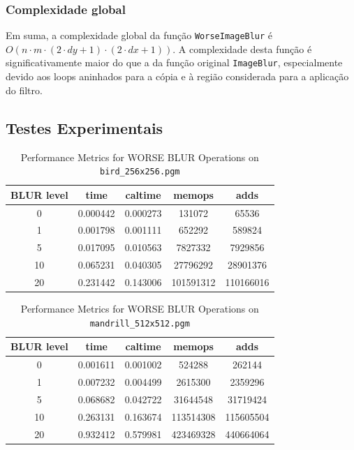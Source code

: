 \documentclass{report}
\begin{document}
\subsubsection{Complexidade global}
Em suma, a complexidade global da função \texttt{WorseImageBlur} é \(O(n \cdot m \cdot (2 \cdot dy + 1) \cdot (2 \cdot dx + 1))\). 
A complexidade desta função é significativamente maior do que a da função original \texttt{ImageBlur},
especialmente devido aos loops aninhados para a cópia e à região considerada para a aplicação do filtro.


\subsection{Testes Experimentais}

\begin{table}[h]
    \centering
    \begin{tabular}{ccccc}
        \toprule
        \textbf{BLUR level} & \textbf{time} & \textbf{caltime} & \textbf{memops} & \textbf{adds} \\
        \midrule
        0 & 0.000442 & 0.000273 & 131072 & 65536 \\
        1 & 0.001798 & 0.001111 & 652292 & 589824 \\
        5 & 0.017095 & 0.010563 & 7827332 & 7929856 \\
        10 & 0.065231 & 0.040305 & 27796292 & 28901376 \\
        20 & 0.231442 & 0.143006 & 101591312 & 110166016 \\
        \bottomrule
    \end{tabular}
    \caption*{Performance Metrics for WORSE BLUR Operations on \texttt{bird\_256x256.pgm}}
\end{table}

\newpage


\begin{table}[h]
    \centering
    \begin{tabular}{ccccc}
        \toprule
        \textbf{BLUR level} & \textbf{time} & \textbf{caltime} & \textbf{memops} & \textbf{adds} \\
        \midrule
        0 & 0.001611 & 0.001002 & 524288 & 262144 \\
        1 & 0.007232 & 0.004499 & 2615300 & 2359296 \\
        5 & 0.068682 & 0.042722 & 31644548 & 31719424 \\
        10 & 0.263131 & 0.163674 & 113514308 & 115605504 \\
        20 & 0.932412 & 0.579981 & 423469328 & 440664064 \\
        \bottomrule
    \end{tabular}
    \caption*{Performance Metrics for WORSE BLUR Operations on \texttt{mandrill\_512x512.pgm}}
\end{table}
\end{document}
